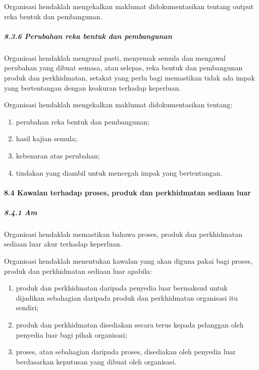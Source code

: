\documentclass[
]{article}
\begin{document}
Organisasi hendaklah mengekalkan maklumat didokumentasikan tentang
output reka bentuk dan pembangunan.

\hypertarget{perubahan-reka-bentuk-dan-pembangunan}{%
\subparagraph{8.3.6 Perubahan reka bentuk dan
pembangunan}\label{perubahan-reka-bentuk-dan-pembangunan}}

Organisasi hendaklah mengenal pasti, menyemak semula dan mengawal
perubahan yang dibuat semasa, atau selepas, reka bentuk dan pembangunan
produk dan perkhidmatan, setakat yang perlu bagi memastikan tidak ada
impak yang bertentangan dengan keakuran terhadap keperluan.

Organisasi hendaklah mengekalkan maklumat didokumentasikan tentang:

\begin{enumerate}
\def\labelenumi{\alph{enumi})}
\item
  perubahan reka bentuk dan pembangunan;
\item
  hasil kajian semula;
\item
  kebenaran atas perubahan;
\item
  tindakan yang diambil untuk mencegah impak yang bertentangan.
\end{enumerate}

\hypertarget{kawalan-terhadap-proses-produk-dan-perkhidmatan-sediaan-luar}{%
\paragraph{8.4 Kawalan terhadap proses, produk dan perkhidmatan sediaan
luar}\label{kawalan-terhadap-proses-produk-dan-perkhidmatan-sediaan-luar}}

\hypertarget{am-6}{%
\subparagraph{8.4.1 Am}\label{am-6}}

Organisasi hendaklah memastikan bahawa proses, produk dan perkhidmatan
sediaan luar akur terhadap keperluan.

Organisasi hendaklah menentukan kawalan yang akan diguna pakai bagi
proses, produk dan perkhidmatan sediaan luar apabila:

\begin{enumerate}
\def\labelenumi{\alph{enumi})}
\item
  produk dan perkhidmatan daripada penyedia luar bermaksud untuk
  dijadikan sebahagian daripada produk dan perkhidmatan organisasi itu
  sendiri;
\item
  produk dan perkhidmatan disediakan secara terus kepada pelanggan oleh
  penyedia luar bagi pihak organisasi;
\item
  proses, atau sebahagian daripada proses, disediakan oleh penyedia luar
  berdasarkan keputusan yang dibuat oleh organisasi.
\end{enumerate}
\end{document}
